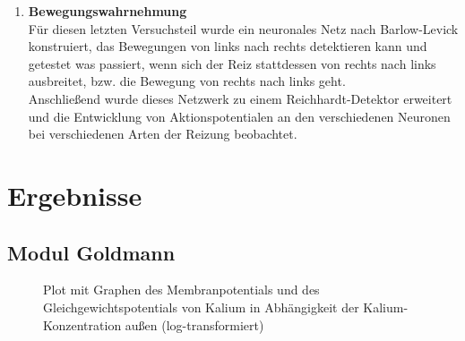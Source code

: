 \documentclass[11pt]{article}
\begin{document}
\begin{enumerate}
\item \textbf{Bewegungswahrnehmung} \\
Für diesen letzten Versuchsteil wurde ein neuronales Netz nach Barlow-Levick konstruiert, das Bewegungen von links nach rechts detektieren kann und getestet was passiert, wenn sich der Reiz stattdessen von rechts nach links ausbreitet, bzw. die Bewegung von rechts nach links geht.\\
Anschließend wurde dieses Netzwerk zu einem Reichhardt-Detektor erweitert und die Entwicklung von Aktionspotentialen an den verschiedenen Neuronen bei verschiedenen Arten der Reizung beobachtet.
\end{enumerate}

\section{Ergebnisse}
\subsection{Modul Goldmann}
\begin{figure}[H]
\caption{Plot mit Graphen des Membranpotentials und des Gleichgewichtspotentials von Kalium in Abhängigkeit der Kalium-Konzentration außen (log-transformiert)}
\label{plot13}
\end{figure}
\end{document}
